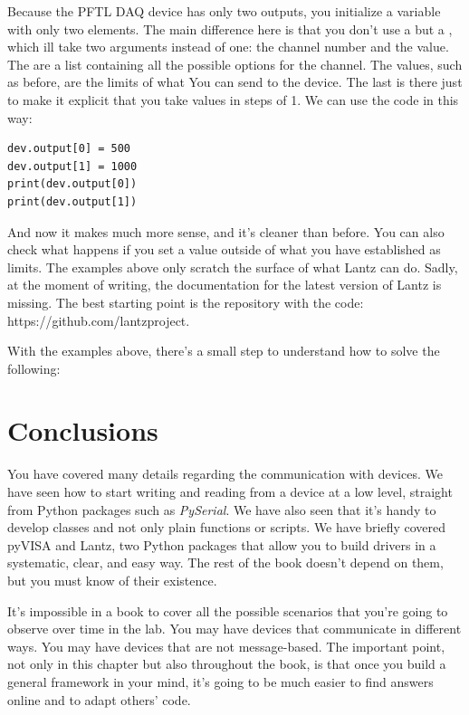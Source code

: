 Because the {PFTL DAQ} device has only two outputs, you initialize a variable  with only two elements. The main difference here is that you don't use a  but a , which ill take two arguments instead of one: the channel number and the value. The  are a list containing all the possible options for the channel. The values, such as before, are the limits of what You can send to the device. The last  is there just to make it explicit that you take values in steps of 1. We can use the code in this way:

\begin{verbatim}
dev.output[0] = 500
dev.output[1] = 1000
print(dev.output[0])
print(dev.output[1])
\end{verbatim}

And now it makes much more sense, and it's cleaner than before. You can also check what happens if you set a value outside of what you have established as limits. The examples above only scratch the surface of what Lantz can do. Sadly, at the moment of writing, the documentation for the latest version of Lantz is missing. The best starting point is the repository with the code: https://github.com/lantzproject.

With the examples above, there's a small step to understand how to solve the following:


\section{Conclusions}\label{sec:conclusions2}
You have covered many details regarding the communication with devices. We have seen how to start writing and reading from a device at a low level, straight from Python packages such as \emph{PySerial}. We have also seen that it's handy to develop classes and not only plain functions or scripts. We have briefly covered pyVISA and Lantz, two Python packages that allow you to build drivers in a systematic, clear, and easy way. The rest of the book doesn't depend on them, but you must know of their existence.

It's impossible in a book to cover all the possible scenarios that you're going to observe over time in the lab. You may have devices that communicate in different ways. You may have devices that are not message-based. The important point, not only in this chapter but also throughout the book, is that once you build a general framework in your mind, it's going to be much easier to find answers online and to adapt others' code.

